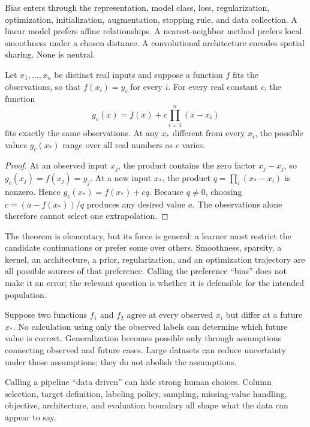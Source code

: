 Bias enters through the representation, model class, loss, regularization,
optimization, initialization, augmentation, stopping rule, and data collection.
A linear model prefers affine relationships. A nearest-neighbor method prefers
local smoothness under a chosen distance. A convolutional architecture encodes
spatial sharing. None is neutral.

\begin{theorem}
\label{thm:finite-interpolation}
Let $x_1,\ldots,x_n$ be distinct real inputs and suppose a function $f$ fits
the observations, so that $f(x_i)=y_i$ for every $i$. For every real constant
$c$, the function
\[
g_c(x)=f(x)+c\prod_{i=1}^{n}(x-x_i)
\]
fits exactly the same observations. At any $x_*$ different from every $x_i$,
the possible values $g_c(x_*)$ range over all real numbers as $c$ varies.
\end{theorem}

\begin{proof}
At an observed input $x_j$, the product contains the zero factor
$x_j-x_j$, so $g_c(x_j)=f(x_j)=y_j$. At a new input $x_*$, the product
$q=\prod_i(x_*-x_i)$ is nonzero. Hence $g_c(x_*)=f(x_*)+cq$. Because $q\ne0$,
choosing $c=(a-f(x_*))/q$ produces any desired value $a$. The observations
alone therefore cannot select one extrapolation.
\end{proof}

The theorem is elementary, but its force is general: a learner must restrict
the candidate continuations or prefer some over others. Smoothness, sparsity,
a kernel, an architecture, a prior, regularization, and an optimization
trajectory are all possible sources of that preference. Calling the preference
``bias'' does not make it an error; the relevant question is whether it is
defensible for the intended population.

Suppose two functions $f_1$ and $f_2$ agree at every observed $x_i$ but differ
at a future $x_*$. No calculation using only the observed labels can determine
which future value is correct. Generalization becomes possible only through
assumptions connecting observed and future cases. Large datasets can reduce
uncertainty under those assumptions; they do not abolish the assumptions.

\begin{warningbox}
Calling a pipeline ``data driven'' can hide strong human choices. Column
selection, target definition, labeling policy, sampling, missing-value handling,
objective, architecture, and evaluation boundary all shape what the data can
appear to say.
\end{warningbox}

